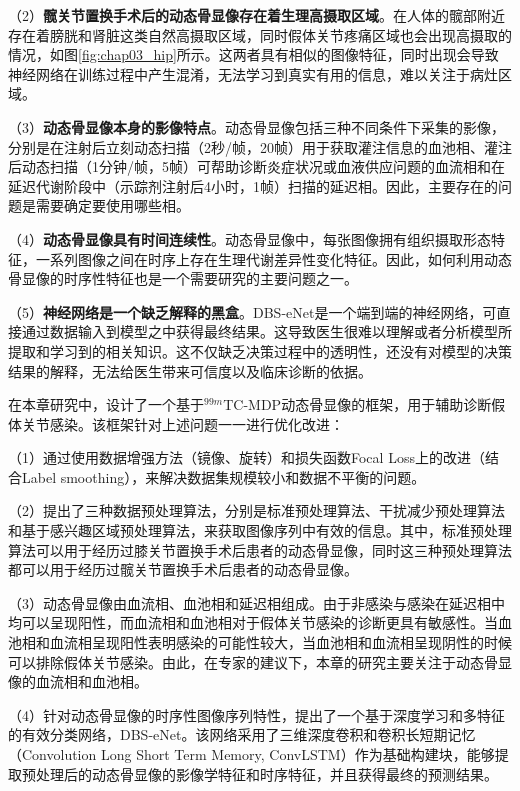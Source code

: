 （2）\textbf{髋关节置换手术后的动态骨显像存在着生理高摄取区域}。在人体的髋部附近存在着膀胱和肾脏这类自然高摄取区域，同时假体关节疼痛区域也会出现高摄取的情况，如图\ref{fig:chap03_hip}所示。这两者具有相似的图像特征，同时出现会导致神经网络在训练过程中产生混淆，无法学习到真实有用的信息，难以关注于病灶区域。

（3）\textbf{动态骨显像本身的影像特点}。动态骨显像包括三种不同条件下采集的影像，分别是在注射后立刻动态扫描（2秒/帧，20帧）用于获取灌注信息的血池相、灌注后动态扫描（1分钟/帧，5帧）可帮助诊断炎症状况或血液供应问题的血流相\cite{schauwecker1992scintigraphic}和在延迟代谢阶段中（示踪剂注射后4小时，1帧）扫描的延迟相。因此，主要存在的问题是需要确定要使用哪些相。

（4）\textbf{动态骨显像具有时间连续性}。动态骨显像中，每张图像拥有组织摄取形态特征，一系列图像之间在时序上存在生理代谢差异性变化特征。因此，如何利用动态骨显像的时序性特征也是一个需要研究的主要问题之一。

（5）\textbf{神经网络是一个缺乏解释的黑盒}。DBS-eNet是一个端到端的神经网络，可直接通过数据输入到模型之中获得最终结果。这导致医生很难以理解或者分析模型所提取和学习到的相关知识。这不仅缺乏决策过程中的透明性，还没有对模型的决策结果的解释，无法给医生带来可信度以及临床诊断的依据。

在本章研究中，设计了一个基于\(^{99m}\)TC-MDP动态骨显像的框架，用于辅助诊断假体关节感染。该框架针对上述问题一一进行优化改进：

（1）通过使用数据增强方法（镜像、旋转）和损失函数Focal Loss\cite{lin2017focal}上的改进（结合Label smoothing\cite{zhang2021delving}），来解决数据集规模较小和数据不平衡的问题。

（2）提出了三种数据预处理算法，分别是标准预处理算法、干扰减少预处理算法和基于感兴趣区域预处理算法，来获取图像序列中有效的信息。其中，标准预处理算法可以用于经历过膝关节置换手术后患者的动态骨显像，同时这三种预处理算法都可以用于经历过髋关节置换手术后患者的动态骨显像。

（3）动态骨显像由血流相、血池相和延迟相组成。由于非感染与感染在延迟相中均可以呈现阳性，而血流相和血池相对于假体关节感染的诊断更具有敏感性。当血池相和血流相呈现阳性表明感染的可能性较大，当血池相和血流相呈现阴性的时候可以排除假体关节感染。由此，在专家的建议下，本章的研究主要关注于动态骨显像的血流相和血池相。

（4）针对动态骨显像的时序性图像序列特性，提出了一个基于深度学习和多特征的有效分类网络，DBS-eNet。该网络采用了三维深度卷积和卷积长短期记忆（Convolution Long Short Term Memory, ConvLSTM）\cite{shi2015convolutional}作为基础构建块，能够提取预处理后的动态骨显像的影像学特征和时序特征，并且获得最终的预测结果。

